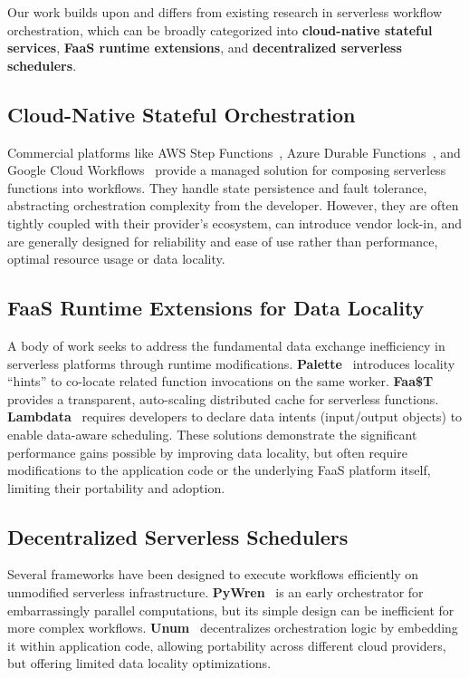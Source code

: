 \documentclass[conference]{IEEEtran}
\begin{document}
Our work builds upon and differs from existing research in serverless workflow orchestration, which can be broadly categorized into \textbf{cloud-native stateful services}, \textbf{FaaS runtime extensions}, and \textbf{decentralized serverless schedulers}.

\subsection{Cloud-Native Stateful Orchestration}
Commercial platforms like AWS Step Functions~\cite{aws_step_functions}, Azure Durable Functions~\cite{azure_durable_functions}, and Google Cloud Workflows~\cite{google_cloud_workflows} provide a managed solution for composing serverless functions into workflows. They handle state persistence and fault tolerance, abstracting orchestration complexity from the developer. However, they are often tightly coupled with their provider's ecosystem, can introduce vendor lock-in, and are generally designed for reliability and ease of use rather than performance, optimal resource usage or data locality.

\subsection{FaaS Runtime Extensions for Data Locality}
A body of work seeks to address the fundamental data exchange inefficiency in serverless platforms through runtime modifications. \textbf{Palette}~\cite{palette_load_balancing} introduces locality ``hints'' to co-locate related function invocations on the same worker. \textbf{Faa\$T}~\cite{faast_caching} provides a transparent, auto-scaling distributed cache for serverless functions. \textbf{Lambdata}~\cite{lambdata_intents} requires developers to declare data intents (input/output objects) to enable data-aware scheduling. These solutions demonstrate the significant performance gains possible by improving data locality, but often require modifications to the application code or the underlying FaaS platform itself, limiting their portability and adoption.

\subsection{Decentralized Serverless Schedulers}
Several frameworks have been designed to execute workflows efficiently on unmodified serverless infrastructure. \textbf{PyWren}~\cite{pywren} is an early orchestrator for embarrassingly parallel computations, but its simple design can be inefficient for more complex workflows. \textbf{Unum}~\cite{unum_decentralized_orchestrator} decentralizes orchestration logic by embedding it within application code, allowing portability across different cloud providers, but offering limited data locality optimizations.
\end{document}
